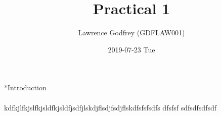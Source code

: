 \documentclass[11pt]{article}
\author{Lawrence Godfrey (GDFLAW001)}
\date{2019-07-23 Tue}
\title{Practical 1}
\begin{document}
\maketitle
*Introduction 

\paragraph{}
kdfkjlfkjslfkjsldfkjsldfjsdfjlskdjflsdjfsdjflskdfsfsfsdfs
dfsfsf 
sdfsdfsdfsdf
\end{document}
